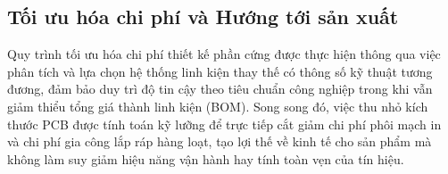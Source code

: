     \subsection{Tối ưu hóa chi phí và Hướng tới sản xuất}
    Quy trình tối ưu hóa chi phí thiết kế phần cứng được thực hiện thông qua việc phân tích và lựa chọn hệ thống linh kiện thay thế có thông số kỹ thuật tương đương, đảm bảo duy trì độ tin cậy theo tiêu chuẩn công nghiệp trong khi vẫn giảm thiểu tổng giá thành linh kiện (BOM). Song song đó, việc thu nhỏ kích thước PCB được tính toán kỹ lưỡng để trực tiếp cắt giảm chi phí phôi mạch in và chi phí gia công lắp ráp hàng loạt, tạo lợi thế về kinh tế cho sản phẩm mà không làm suy giảm hiệu năng vận hành hay tính toàn vẹn của tín hiệu.

